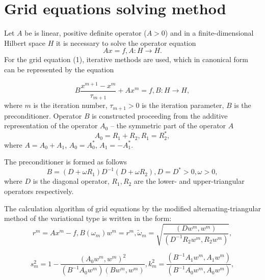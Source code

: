 \documentclass{svproc}
\begin{document}
%
\section{Grid equations solving method}
%
Let $A$ be is linear, positive definite operator ($A>0$) and in a finite-dimensional Hilbert space $H$ it is necessary to solve the operator equation
\begin{equation}	
	A x = f, A : H \rightarrow H.
\end{equation}
For the grid equation (1), iterative methods are used, which in canonical form can be represented by the equation~\cite{2020:Sukhinov:Atayan,2021:Sukhinov:Litvinov}

\begin{equation}	
	B \frac{x^{m+1} - x^m}{\tau_{m+1}} + A x^m = f,
	B : H \rightarrow H,
\end{equation}
where
$m$ is the iteration number,
$\tau_{m+1}>0$ is the iteration parameter,
$B$ is the preconditioner.
Operator $B$ is constructed proceeding from the additive representation of the operator $A_0$ – the symmetric part of the operator $A$
\begin{equation}	
	A_0 = R_1 + R_2,
	R_1 = R_2^*,
\end{equation}
where 
$ A = A_0 + A_1 $,
$ A_0 = A_0^* $,
$ A_1 = - A_1^* $.

The preconditioner is formed as follows
\begin{equation}	
	B = \left(  D + \omega R_1  \right) D^{-1} \left(  D + \omega R_2  \right),
	D = D^* > 0,
	\omega > 0,
\end{equation}
where
$D$ is the diagonal operator,
$R_1, R_2$ are the lower- and upper-triangular operators respectively.

The calculation algorithm of grid equations by the modified alternating-triangular method of the variational type is written in the form:
\begin{equation*}	
	r^m = A x^m - f,
	B(\omega_m)w^m = r^m,
	\tilde{\omega}_m = \sqrt{\frac{(D w^m, w^m)}{(D^{-1} R_2 w^m, R_2 w^m)}},
\end{equation*}

\begin{equation}	
	s_m^2 = 1 - \frac{ \left( A_0 w^m, w^m \right)^2 }{ \left( B^{-1} A_0 w^m \right) \left( B w^m, w^m \right) },
	k_m^2 = \frac{\left( B^{-1} A_1 w^m, A_1 w^m \right)}{\left( B^{-1} A_0 w^m, A_0 w^m \right)},
\end{equation}
\end{document}
